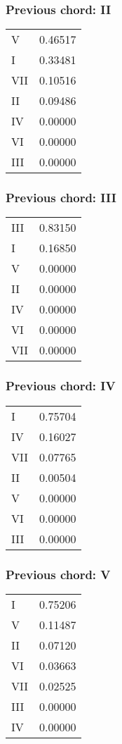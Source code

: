 \subsubsection*{Previous chord: II}


\begin{tabular}{l l}
V & 0.46517 \\
I & 0.33481 \\
VII & 0.10516 \\
II & 0.09486 \\
IV & 0.00000 \\
VI & 0.00000 \\
III & 0.00000 \\
\end{tabular}


\subsubsection*{Previous chord: III}


\begin{tabular}{l l}
III & 0.83150 \\
I & 0.16850 \\
V & 0.00000 \\
II & 0.00000 \\
IV & 0.00000 \\
VI & 0.00000 \\
VII & 0.00000 \\
\end{tabular}


\subsubsection*{Previous chord: IV}


\begin{tabular}{l l}
I & 0.75704 \\
IV & 0.16027 \\
VII & 0.07765 \\
II & 0.00504 \\
V & 0.00000 \\
VI & 0.00000 \\
III & 0.00000 \\
\end{tabular}


\subsubsection*{Previous chord: V}


\begin{tabular}{l l}
I & 0.75206 \\
V & 0.11487 \\
II & 0.07120 \\
VI & 0.03663 \\
VII & 0.02525 \\
III & 0.00000 \\
IV & 0.00000 \\
\end{tabular}


